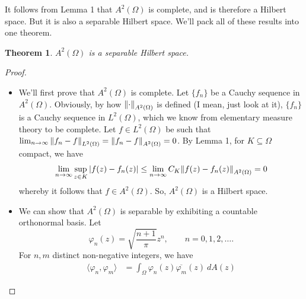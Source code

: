 \documentclass[10pt]{article}
\theoremstyle{plain}
\newtheorem{theorem}{Theorem}
\begin{document}
	It follows from Lemma 1 that $A^2(\Omega)$ is complete, and is therefore a Hilbert space. But it is also a separable Hilbert space. We'll pack all of these results into one theorem.
		\begin{theorem}
			$A^2(\Omega)$ is a separable Hilbert space.
		\end{theorem}
		\begin{proof} ~
				\begin{itemize}
					\item We'll first prove that $A^2(\Omega)$ is complete. Let $\{f_n\}$ be a Cauchy sequence in $A^2(\Omega)$. Obviously, by how $\norm{\cdot}_{A^2(\Omega)}$ is defined (I mean, just look at it), $\{f_n\}$ is a Cauchy sequence in $L^2(\Omega)$, which we know from elementary measure theory to be complete. Let $f \in L^2(\Omega)$ be such that $\lim_{n \to \infty} \norm{f_n - f}_{L^2(\Omega)} = \norm{f_n - f}_{A^2(\Omega)}= 0$. By Lemma 1, for $K \subseteq \Omega$ compact, we have
						\begin{align*}
							\lim_{n \to \infty} \sup_{z \in K} |f(z) - f_n(z)| \leq \lim_{n \to \infty} C_K \norm{f(z) - f_n(z)}_{A^2(\Omega)} = 0    
						\end{align*}
					whereby it follows that $f \in A^2(\Omega)$. So, $A^2(\Omega)$ is a Hilbert space.
					
					\item We can show that $A^2(\Omega)$ is separable by exhibiting a countable orthonormal basis. Let $$\varphi_n(z) = \sqrt{\frac{n + 1}{\pi}}z^n, \qquad n = 0, 1, 2, \dots.$$ For $n, m$ distinct non-negative integers, we have
						\begin{align*}
							\langle \varphi_n, \varphi_m \rangle &= \int_\Omega \varphi_n(z) \overline{\varphi_m}(z) \ dA(z) 
						\end{align*}
					
					
				\end{itemize}
		\end{proof}
\end{document}
